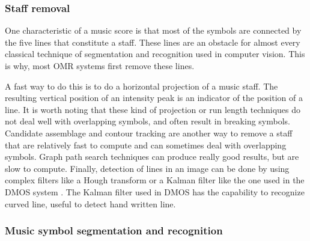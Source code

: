 \documentclass[11pt]{sdm}
\begin{document}
\subsubsection{Staff removal}

One characteristic of a music score is that most of the symbols are connected by the five lines that constitute a staff.
These lines are an obstacle for almost every classical technique of segmentation and recognition used in computer vision.
This is why, most OMR systems first remove these lines.

A fast way to do this is to do a horizontal projection of a music staff.
The resulting vertical position of an intensity peak is an indicator of the position of a line.
It is worth noting that these kind of projection or run length techniques do not deal well with overlapping symbols, and often result in breaking symbols.
Candidate assemblage and contour tracking are another way to remove a staff that are relatively fast to compute and can sometimes deal with overlapping symbols.
Graph path search techniques can produce really good results, but are slow to compute.
Finally, detection of lines in an image can be done by using complex filters like a Hough transform or a Kalman filter like the one used in the DMOS system \cite{couasnon_dmos_2001}.
The Kalman filter used in DMOS has the capability to recognize curved line, useful to detect hand written line.

\subsubsection{Music symbol segmentation and recognition}
\end{document}
